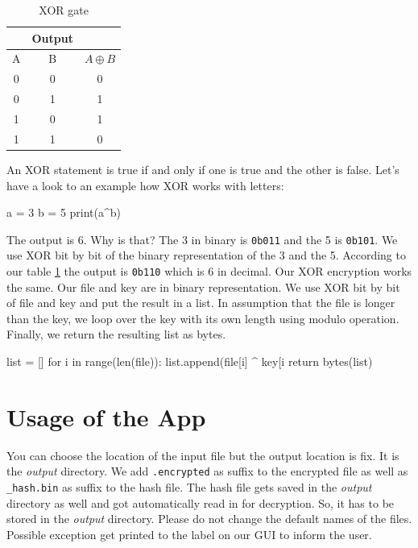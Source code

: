 \documentclass[]{article}
\begin{document}
\begin{table}[h]
    \centering
    \begin{tabular}{|c|c|c|}
        \hline
        \rowcolor{blue2} \multicolumn{2}{|c|}{\textbf{Input}} & \textbf{Output} \\
        \hline
        \rowcolor{blue2} A & B & $A \oplus B$ \\
        \hline
        \rowcolor{red2} 0 & 0 & 0 \\
        \hline
        \rowcolor{green2} 0 & 1 & 1 \\
        \hline
        \rowcolor{green2} 1 & 0 & 1 \\
        \hline
        \rowcolor{red2} 1 & 1 & 0 \\
        \hline
    \end{tabular}
    \caption{XOR gate}
    \label{tab:xor}
    \cite{enwiki:1139577080}
\end{table}
\noindent
An XOR statement is true if and only if one is true and the other is false. Let's have a look to an example
how XOR works with letters:

\begin{python}
a = 3
b = 5
print(a^b)
\end{python}
\noindent 
The output is 6. Why is that? The 3 in binary is \texttt{0b011} and the 5 is \texttt{0b101}. We use 
XOR bit by bit of the binary representation of the 3 and the 5. According to our
table \ref{tab:xor} the output is \texttt{0b110} which is 6 in decimal. \cite{delft}
\noindent
Our XOR encryption works the same. Our file and key are in binary representation. We use XOR bit by bit of 
file and key and put the result in a list. In assumption that the file is longer than the key, we loop over
the key with its own length using modulo operation. Finally, we return the resulting list as bytes.
\cite{geek}
\begin{python}
list = []  
for i in range(len(file)):
    list.append(file[i] ^ key[i %
return bytes(list)
\end{python} 


\section{Usage of the App}
You can choose the location of the input file but the output location is fix.
It is the \textit{output} directory. We add \texttt{.encrypted} as suffix to the encrypted file as well as
\texttt{\_hash.bin} as suffix to the hash file.
The hash file gets saved in the \textit{output} directory as well and got automatically read in 
for decryption. So, it has to be stored in the \textit{output} directory. Please do not change 
the default names of the files. Possible exception get printed to the label on our GUI to inform
the user. 
\end{document}
